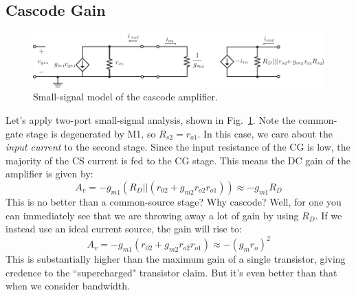 \subsection{Cascode Gain}
\begin{figure}[tb]
\centering
\includegraphics[scale=0.95]{11cascode_ss}
\caption{Small-signal model of the cascode amplifier.}
\label{fig:11cascode_ss}
\end{figure}
Let's apply two-port small-signal analysis, shown in Fig.~\ref{fig:11cascode_ss}.  Note the common-gate stage is degenerated by M1, so $R_{s2} = r_{o1}$. In this case, we care about the \textit{input current }to the second stage. Since the input resistance of the CG is low, the majority of the CS current is fed to the CG stage.  This means the DC gain of the amplifier is given by:
    \begin{equation}
        A_v = -g_{m1} \left(R_D || (r_{02} + g_{m2}r_{o2} r_{o1}) \right) \approx -g_{m1} R_D
    \end{equation}
This is no better than a common-source stage?  Why cascode?  Well, for one you can immediately see that we are throwing away a lot of gain by using $R_D$.  If we instead use an ideal current source, the gain will rise to:
    \begin{equation}
        A_v = -g_{m1}  (r_{02} + g_{m2}r_{o2} r_{o1}) \approx - (g_m r_o)^2 
    \end{equation}
This is substantially higher than the maximum gain of a single transistor, giving credence to the ``supercharged" transistor claim.  But it's even better than that when we consider bandwidth. 

